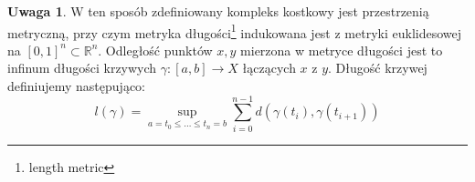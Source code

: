 \documentclass[licencjacka]{pracamgr}
\theoremstyle{definition}
\theoremstyle{definition}
\newtheorem{remark}{Uwaga}[section]
\theoremstyle{definition}
\theoremstyle{definition}
\theoremstyle{plain}
\theoremstyle{plain}
\begin{document}
\begin{remark}
	W ten sposób zdefiniowany kompleks kostkowy jest przestrzenią metryczną, przy czym 
	metryka długości\footnote{length metric} indukowana jest z metryki euklidesowej 
	na $ [0,1]^n \subset \mathbb{R}^n$. Odległość punktów $ x,y $ mierzona w metryce 
	długości jest to infinum długości krzywych $ \gamma : [a,b] \rightarrow X $ 
	łączących $ x$ z $ y $. Długość krzywej definiujemy następująco: 
	$$ l(\gamma) = \sup\limits_{a = t_0 \leq \dots \leq t_n = b} \sum\limits_{i=0}^{n-1}
	d(\gamma(t_i), \gamma(t_{i+1})) $$
\end{remark}
\end{document}
